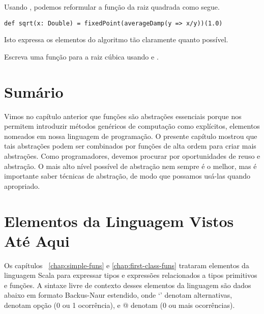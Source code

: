 Usando , podemos reformular a fun\c{c}\~{a}o da raiz quadrada
como segue. 
\begin{lstlisting}
def sqrt(x: Double) = fixedPoint(averageDamp(y => x/y))(1.0)
\end{lstlisting}

Isto expressa os elementos do algoritmo t\~{a}o claramente quanto poss\'{i}vel.
\begin{exercise} 
Escreva uma fun\c{c}\~{a}o para a raiz c\'{u}bica usando  e .  
\end{exercise}

\section{Sumário}

Vimos no cap\'{i}tulo anterior que fun\c{c}\~{o}es s\~{a}o abstra\c{c}\~{o}es essenciais porque 
nos permitem introduzir m\'{e}todos gen\'{e}ricos de computa\c{c}\~{a}o como expl\'{i}citos,
elementos nomeados em nossa linguagem de programa\c{c}\~{a}o. O presente cap\'{i}tulo
mostrou que tais abstra\c{c}\~{o}es podem ser combinados por fun\c{c}\~{o}es de alta ordem
para criar mais abstra\c{c}\~{o}es. Como programadores, devemos procurar por oportunidades 
de reuso e abstra\c{c}\~{a}o. O mais alto n\'{i}vel poss\'{i}vel de abstra\c{c}\~{a}o nem sempre \'{e} 
o melhor, mas \'{e} importante saber t\'{e}cnicas de abstra\c{c}\~{a}o, de modo que possamos
us\'{a}-las quando apropriado. 

\section{Elementos da Linguagem Vistos At\'{e} Aqui}

 Os cap\'{i}tulos ~\ref{chap:simple-funs} e \ref{chap:first-class-funs} trataram
elementos da linguagem Scala para expressar tipos e express\~{o}es relacionados a
tipos primitivos e fun\c{c}\~{o}es. A sintaxe livre de contexto desses elementos da
linguagem s\~{a}o dados abaixo em formato Backus-Naur estendido, onde `\code{|}'
denotam alternativas, \code{[...]} denotam op\c{c}\~{a}o  (0 ou 1 ocorr\^{e}ncia), e  
@ denotam (0 ou mais ocorr\^{e}ncias). 

